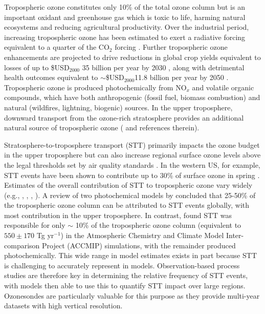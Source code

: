 \documentclass{article}
\begin{document}
    Tropospheric ozone constitutes only 10\% of the total ozone column but is an important oxidant and greenhouse gas which is toxic to life, harming natural ecosystems and reducing agricultural productivity.
    Over the industrial period, increasing tropospheric ozone has been estimated to exert a radiative forcing equivalent to a quarter of the CO$_2$ forcing \citep{IPCC_Chapter2}. 
    Further tropospheric ozone enhancements are projected to drive reductions in global crop yields equivalent to losses of up to \$USD$_{2000}$ 35 billion per year by 2030 \citep{Avnery2011}, along with detrimental health outcomes equivalent to $\sim$\$USD$_{2000}$11.8 billion per year by 2050 \citep{Selin2009}.
    Tropospheric ozone is produced photochemically from NO$_x$ and volatile organic compounds, which have both anthropogenic (fossil fuel, biomass combustion) and natural (wildfires, lightning, biogenic) sources.
    In the upper troposphere, downward transport from the ozone-rich stratosphere provides an additional natural source of tropospheric ozone (\citet{Jacobson2000} and references therein). 
 
    Stratosphere-to-troposphere transport (STT) primarily impacts the ozone budget in the upper troposphere but can also increase regional surface ozone levels above the legal thresholds set by air quality standards \citep{Danielson1968, Lefohn2011, Langford2012, Zhang2014}.
    In the western US, for example, STT events have been shown to contribute up to 30\% of surface ozone in spring \citep{Lin2012}.
    Estimates of the overall contribution of STT to tropospheric ozone vary widely (e.g., \citep{Galani2003},  \citet{Stohl2003}, \citet{Stevenson2006}, \citet{Lefohn2011}).
    A review of two photochemical models by \citet{Stohl2003} concluded that 25-50\% of the tropospheric ozone column can be attributed to STT events globally, with most contribution in the upper troposphere.
    In contrast, \citet{Stevenson2006} found STT was responsible for only $\sim$ 10\% of the tropospheric ozone column (equivalent to $550\pm170$ Tg yr$^{-1}$) in the Atmospheric Chemistry and Climate Model Inter-comparison Project (ACCMIP) simulations, with the remainder produced photochemically.
    This wide range in model estimates exists in part because STT is challenging to accurately represent in models.
    Observation-based process studies are therefore key in determining the relative frequency of STT events, with models then able to use this to quantify STT impact over large regions.
    Ozonesondes are particularly valuable for this purpose as they provide multi-year datasets with high vertical resolution.
    
\end{document}
